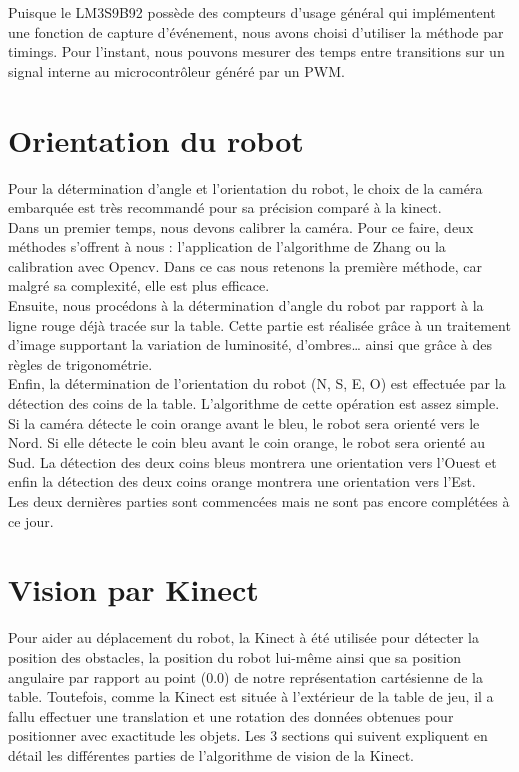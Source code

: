 Puisque le LM3S9B92 possède des compteurs d'usage général qui implémentent une fonction de capture d'événement, nous avons choisi d'utiliser la méthode par timings. Pour l'instant, nous pouvons mesurer des temps entre transitions sur un signal interne au microcontrôleur généré par un PWM.


\section{Orientation du robot}

Pour la détermination d’angle et l’orientation du robot, le choix de la caméra embarquée  est très recommandé pour sa précision comparé à la kinect. \\
Dans un premier temps, nous devons calibrer la caméra. Pour ce faire, deux méthodes s’offrent à nous : l’application de l’algorithme de Zhang ou la calibration avec Opencv. Dans ce cas nous retenons la première méthode, car malgré sa complexité, elle est plus efficace. \\
Ensuite, nous procédons à la détermination d’angle du robot par rapport à la ligne rouge déjà tracée sur la table.  Cette partie est réalisée grâce à un traitement d’image supportant la variation de luminosité, d’ombres… ainsi que grâce à des règles de trigonométrie.\\
Enfin,  la détermination de l’orientation du robot (N, S, E, O) est effectuée par la détection des coins de la table. 
L’algorithme de cette opération est assez simple. Si la caméra détecte le coin orange avant le bleu, le robot sera orienté vers le Nord. Si elle détecte le coin bleu avant le coin orange, le robot sera orienté au Sud. La détection des deux coins bleus montrera une orientation vers l’Ouest et enfin la détection des deux coins orange montrera une orientation vers l’Est.\\
Les deux dernières parties sont commencées mais ne sont pas encore complétées à ce jour.


\section{Vision par Kinect}
Pour aider au déplacement du robot, la Kinect à été utilisée pour détecter la position des obstacles, la position du robot lui-même ainsi que sa position angulaire par rapport au point (0.0) de notre représentation cartésienne de la table. Toutefois, comme la Kinect est située à l'extérieur de la table de jeu, il a fallu effectuer une translation et une rotation des données obtenues pour positionner avec exactitude les objets. Les 3 sections qui suivent expliquent en détail les différentes parties de l'algorithme de vision de la Kinect.

